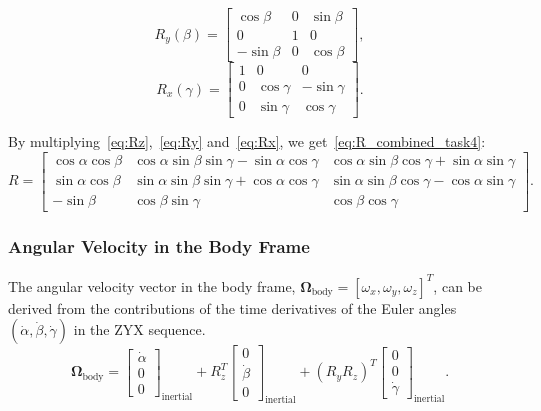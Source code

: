 \documentclass[12pt]{article}
\begin{document}
\begin{equation}
\label{eq:Ry}
R_y(\beta) =
\begin{bmatrix}
\cos\beta & 0 & \sin\beta \\
0 & 1 & 0 \\
-\sin\beta & 0 & \cos\beta
\end{bmatrix}, 
\end{equation}
\begin{equation}
\label{eq:Rx}
R_x(\gamma) =
\begin{bmatrix}
1 & 0 & 0 \\
0 & \cos\gamma & -\sin\gamma \\
0 & \sin\gamma & \cos\gamma
\end{bmatrix}.
\end{equation}


By multiplying~\ref{eq:Rz},~\ref{eq:Ry} and~\ref{eq:Rx}, we get~\ref{eq:R_combined_task4}:
\begin{equation}
\label{eq:R_full_task4}
R =
\begin{bmatrix}
\cos\alpha\cos\beta & \cos\alpha\sin\beta\sin\gamma - \sin\alpha\cos\gamma & \cos\alpha\sin\beta\cos\gamma + \sin\alpha\sin\gamma \\
\sin\alpha\cos\beta & \sin\alpha\sin\beta\sin\gamma + \cos\alpha\cos\gamma & \sin\alpha\sin\beta\cos\gamma - \cos\alpha\sin\gamma \\
-\sin\beta & \cos\beta\sin\gamma & \cos\beta\cos\gamma
\end{bmatrix}.
\end{equation}


\subsubsection{Angular Velocity in the Body Frame}

The angular velocity vector in the body frame, \(\boldsymbol{\Omega}_{\text{body}} = [\omega_x, \omega_y, \omega_z]^T\), can be derived from the contributions of the time derivatives of the Euler angles \((\dot{\alpha}, \dot{\beta}, \dot{\gamma})\) in the ZYX sequence.
\begin{equation}
\label{eq:omega_body_decomposition}
\boldsymbol{\Omega}_{\text{body}} =
\begin{bmatrix}
\dot{\alpha} \\
0 \\
0
\end{bmatrix}_{\text{inertial}}
+ R_z^T
\begin{bmatrix}
0 \\
\dot{\beta} \\
0
\end{bmatrix}_{\text{inertial}}
+ (R_y R_z)^T
\begin{bmatrix}
0 \\
0 \\
\dot{\gamma}
\end{bmatrix}_{\text{inertial}}.
\end{equation}
\end{document}
